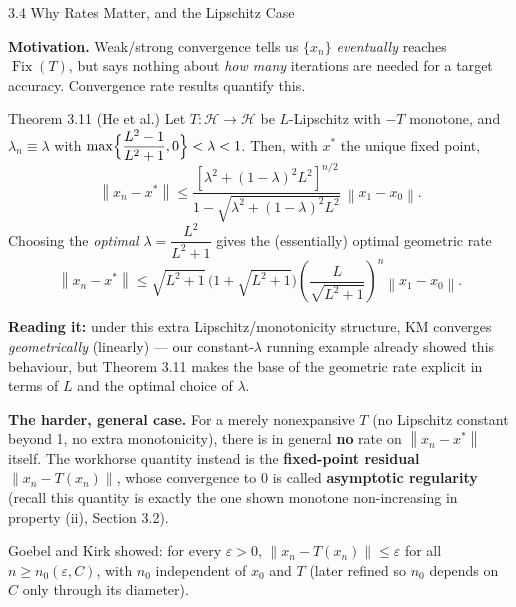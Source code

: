\documentclass[aspectratio=169,10pt]{beamer}
\newcommand{\cH}{\mathcal{H}}
\newcommand{\Fix}{\operatorname{Fix}}
\newcommand{\norm}[1]{\left\|#1\right\|}
\begin{document}
\begin{frame}[allowframebreaks]{3.4 Why Rates Matter, and the Lipschitz Case}

  \textbf{Motivation.} Weak/strong convergence tells us $\{x_n\}$
  \emph{eventually} reaches $\Fix(T)$, but says nothing about \emph{how
  many} iterations are needed for a target accuracy. Convergence rate
  results quantify this.

  \begin{block}{Theorem 3.11 (He et al.)}
    Let $T:\cH\to\cH$ be $L$-Lipschitz with $-T$ monotone, and
    $\lambda_n\equiv\lambda$ with
    $\max\Bigl\{\dfrac{L^2-1}{L^2+1},0\Bigr\}<\lambda<1$. Then, with
    $x^*$ the unique fixed point,
    $$\norm{x_n-x^*}\le\frac{[\lambda^2+(1-\lambda)^2L^2]^{n/2}}
      {1-\sqrt{\lambda^2+(1-\lambda)^2L^2}}\,\norm{x_1-x_0}.$$
    Choosing the \emph{optimal} $\lambda=\dfrac{L^2}{L^2+1}$ gives the
    (essentially) optimal geometric rate
    $$\norm{x_n-x^*}\le\sqrt{L^2+1}\,\bigl(1+\sqrt{L^2+1}\bigr)
      \left(\frac{L}{\sqrt{L^2+1}}\right)^{n}\norm{x_1-x_0}.$$
  \end{block}
  \textbf{Reading it:} under this extra Lipschitz/monotonicity
  structure, KM converges \emph{geometrically} (linearly) --- our
  constant-$\lambda$ running example already showed this behaviour, but
  Theorem 3.11 makes the base of the geometric rate explicit in terms
  of $L$ and the optimal choice of $\lambda$.

  \framebreak

  \textbf{The harder, general case.} For a merely nonexpansive $T$
  (no Lipschitz constant beyond 1, no extra monotonicity), there is in
  general \textbf{no} rate on $\norm{x_n-x^*}$ itself. The workhorse
  quantity instead is the \textbf{fixed-point residual}
  $\norm{x_n-T(x_n)}$, whose convergence to $0$ is called
  \textbf{asymptotic regularity} (recall this quantity is exactly the
  one shown monotone non-increasing in property (ii), Section 3.2).

  Goebel and Kirk showed: for every $\varepsilon>0$,
  $\norm{x_n-T(x_n)}\le\varepsilon$ for all $n\ge n_0(\varepsilon,C)$,
  with $n_0$ independent of $x_0$ and $T$ (later refined so $n_0$
  depends on $C$ only through its diameter).
\end{frame}
\end{document}
